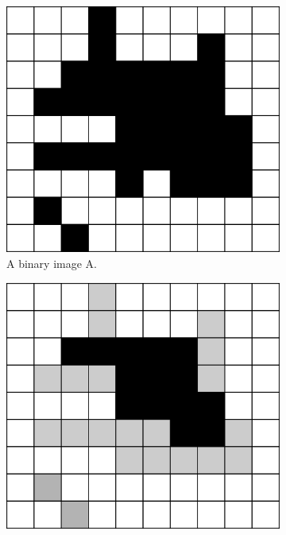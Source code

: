 \documentclass[
  digital,     %
  oneside,     %
  nosansbold,  %
  nocolorbold, %
  lof,         %
  lot,         %
]{fithesis4}
\begin{document}
\begin{figure}
    \begin{subfigure}[t]{0.4\textwidth}
        \centering
        \includegraphics[width=\textwidth]{resources/inkscape/opening_orig.png}
        \caption{A binary image A.}
        \label{fig:opening_orig}
    \end{subfigure}
    \begin{subfigure}[t]{0.4\textwidth}
        \centering
        \includegraphics[width=\textwidth]{resources/inkscape/opening_erosion.png}

\end{subfigure}
\end{figure}
\end{document}
